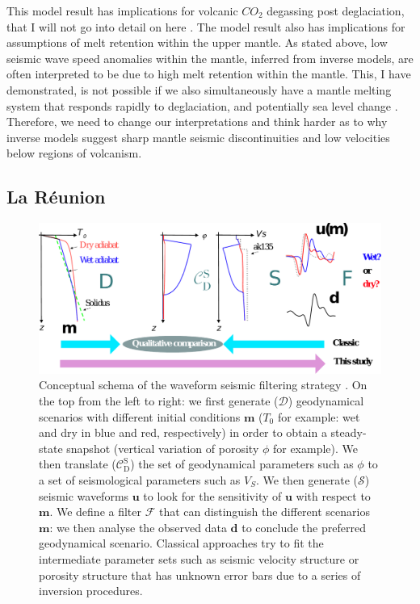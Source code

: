 This model result has implications for volcanic $CO_{2}$ degassing post deglaciation, that I will not go into detail on here \citep[see][]{armitage-etal-grl-2019}. The model result also has implications for assumptions of melt retention within the upper mantle. As stated above, low seismic wave speed anomalies within the mantle, inferred from inverse models, are often interpreted to be due to high melt retention within the mantle. This, I have demonstrated, is not possible if we also simultaneously have a mantle melting system that responds rapidly to deglaciation, and potentially sea level change \citep{huybers-2009}. Therefore, we need to change our interpretations and think harder as to why inverse models suggest sharp mantle seismic discontinuities and low velocities below regions of volcanism.

\subsection{La Réunion}

\begin{figure}
\centering
\includegraphics[width=\textwidth]{figures/ch2-schema.pdf}
\caption{Conceptual schema of the waveform seismic filtering strategy \citep[see][]{franken-etal-2020}. On the top from the left to right: we first generate ($\mathcal{D}$)  geodynamical scenarios with different initial conditions $\mathbf{m}$ ($T_0$ for example: wet and dry in blue and red, respectively) in order to obtain a steady-state snapshot (vertical variation of porosity $\phi$ for example). We then translate  ($\mathcal{C}_\mathrm{D}^\mathrm{S}$) the set of geodynamical parameters such as $\phi$ to a set of seismological parameters such as $V_S$. We then generate ($\mathcal{S}$) seismic waveforms $\mathbf{u}$ to look for the sensitivity of $\mathbf{u}$ with respect to $\mathbf{m}$. We define a filter $\mathcal{F}$ that can distinguish the different scenarios $\mathbf{m}$: we then analyse the observed data $\mathbf{d}$ to conclude the preferred geodynamical scenario. Classical approaches try to fit the intermediate parameter sets such as seismic velocity structure or porosity structure that has unknown error bars due to a series of inversion procedures.}
\label{fg:inversion}
\end{figure}

